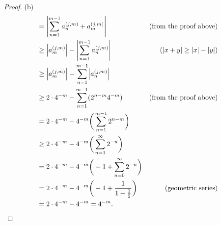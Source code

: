 \begin{proof}{(b)}
\begin{align*}
         & = \abs{\sum_{n = 1}^{m - 1} a_n^{(j, m)} + a_m^{(j, m)}}                                        & \text{(from the proof above)}        \\
         & \geq \abs{a_m^{(j, m)}} - \abs{\sum_{n = 1}^{m - 1} a_n^{(j, m)}}                               & (\abs{x + y} \geq \abs{x} - \abs{y}) \\
         & \geq \abs{a_m^{(j, m)}} - \sum_{n = 1}^{m - 1} \abs{a_n^{(j, m)}}                                                                      \\
         & \geq 2 \cdot 4^{-m} - \sum_{n = 1}^{m - 1} (2^{n - m} 4^{-m})                                   & \text{(from the proof above)}        \\
         & = 2 \cdot 4^{-m} - 4^{-m} \bigg(\sum_{n = 1}^{m - 1} 2^{n - m}\bigg)                                                                   \\
         & \geq 2 \cdot 4^{-m} - 4^{-m} \bigg(\sum_{n = 1}^\infty 2^{-n}\bigg)                                                                    \\
         & = 2 \cdot 4^{-m} - 4^{-m} \bigg(-1 + \sum_{n = 0}^\infty 2^{-n}\bigg)                                                                  \\
         & = 2 \cdot 4^{-m} - 4^{-m} \bigg(-1 + \frac{1}{1 - \frac{1}{2}}\bigg)                            & \text{(geometric series)}            \\
         & = 2 \cdot 4^{-m} - 4^{-m} = 4^{-m}.
    \end{align*}
\end{proof}

